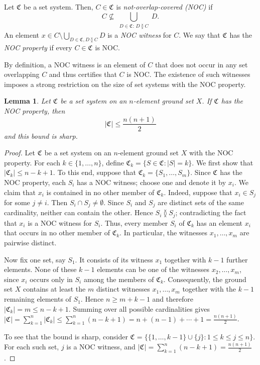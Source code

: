 \documentclass[preprint]{elsarticle}
\newtheorem{lemma}[theorem]{Lemma}
\newcommand{\CS}[1][]{\ensuremath{\mathfrak{C}_{#1}}}
\newcommand{\overlaps}{\between}
\begin{document}
\begin{definition}
	Let $\CS$ be a set system. Then, $C\in\CS$  is \emph{not-overlap-covered (NOC)} if
		\[C\not\subseteq\bigcup_{\substack{D\in\CS:\, D\overlaps C}} D.\]
	An element $x\in C\setminus\bigcup_{D\in\CS,D\overlaps C} D$ is a \emph{NOC witness} for $C$. 
	We say that $\CS$ has the \emph{NOC property} if every $C\in\CS$ is NOC.
\end{definition}
%



By definition, a NOC witness is an element of $C$ that does not occur
in any set overlapping $C$ and thus certifies that $C$ is NOC.
The existence of such witnesses imposes a strong restriction on the size of set systems
with the NOC property.


\begin{lemma}\label{lem:NOC-size}
	Let $\CS$ be a set system on an $n$-element ground set $X$. If $\CS$ has the NOC property, then
	\[|\CS|\leq \frac{n(n+1)}{2}\] and this bound is sharp.
\end{lemma}
\begin{proof}
Let $\CS$ be a set system on an $n$-element ground set $X$
with the NOC property. For each $k\in\{1,\ldots,n\}$,
define $\CS[k]=\{S\in\CS\colon |S|=k\}$. We first show that $ |\CS[k]|\leq n-k+1$. To this end,
suppose that $\CS[k]=\{S_1,\ldots,S_m\}$. Since $\CS$ has the NOC property, each $S_i$ has a
NOC witness; choose one and denote it by $x_i$. We claim that $x_i$ is contained in no other member
of $\CS[k]$. Indeed, suppose that $ x_i\in S_j$ for some $j\neq i$. Then $S_i\cap
S_j\neq\emptyset$. Since $S_i$ and $S_j$ are distinct sets of the same cardinality, neither can
contain the other. Hence $S_i\overlaps S_j$; contradicting the fact that $x_i$ is a NOC witness for
$S_i$. Thus, every member $S_i$ of $\CS[k]$ has an element $x_i$ that occurs in no other member of
$\CS[k]$. In particular, the witnesses $x_1,\ldots,x_m$ are pairwise distinct.

Now fix one set, say $S_1$. It consists of its witness $x_1$ together with $k-1$ further elements.
None of these $k-1$ elements can be one of the witnesses $x_2,\ldots,x_m$, since $x_i$ occurs only
in $S_i$ among the members of $\CS[k]$. Consequently, the ground set $X$ contains at least the $m$
distinct witnesses $x_1,\ldots,x_m$ together with the $k-1$ remaining elements of $S_1$. Hence
$n\geq m+k-1$ and therefore $ |\CS[k]|=m\leq n-k+1. $
Summing over all possible cardinalities gives $ |\CS| = \sum_{k=1}^n |\CS[k]| \leq
\sum_{k=1}^n(n-k+1) = n+(n-1)+\cdots+1 =\frac{n(n+1)}{2} $. 

To see that the bound is sharp, consider
$\CS=\bigl\{\{1,\ldots,k-1\}\cup\{j\}:1\leq k\leq j\leq n\bigr\}$.
For each such set, $j$ is a NOC witness, and
$|\CS|=\sum_{k=1}^n(n-k+1)=\frac{n(n+1)}{2}$.
\end{proof}
\end{document}
